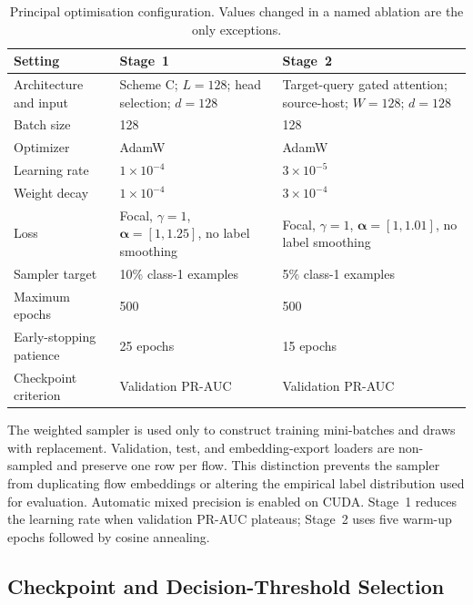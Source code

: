 \documentclass[11pt,fleqn]{report}
\begin{document}
\begin{table}[H]
    \centering
    \caption{Principal optimisation configuration. Values changed in a named ablation are the only exceptions.}
    \label{tab:experimental_training_config}
    \begin{tabular}{@{}p{3.0cm}p{4.6cm}p{5.7cm}@{}}
        \toprule
        Setting & Stage~1 & Stage~2 \\
        \midrule
        Architecture and input & Scheme C; $L=128$; head selection; $d=128$ & Target-query gated attention; source-host; $W=128$; $d=128$ \\
        Batch size & 128 & 128 \\
        Optimizer & AdamW & AdamW \\
        Learning rate & $1\times10^{-4}$ & $3\times10^{-5}$ \\
        Weight decay & $1\times10^{-4}$ & $3\times10^{-4}$ \\
        Loss & Focal, $\gamma=1$, $\boldsymbol{\alpha}=[1,1.25]$, no label smoothing & Focal, $\gamma=1$, $\boldsymbol{\alpha}=[1,1.01]$, no label smoothing \\
        Sampler target & 10\% class-1 examples & 5\% class-1 examples \\
        Maximum epochs & 500 & 500 \\
        Early-stopping patience & 25 epochs & 15 epochs \\
        Checkpoint criterion & Validation PR-AUC & Validation PR-AUC \\
        \bottomrule
    \end{tabular}
\end{table}

The weighted sampler is used only to construct training mini-batches and draws with replacement. Validation, test, and embedding-export loaders are non-sampled and preserve one row per flow. This distinction prevents the sampler from duplicating flow embeddings or altering the empirical label distribution used for evaluation. Automatic mixed precision is enabled on CUDA. Stage~1 reduces the learning rate when validation PR-AUC plateaus; Stage~2 uses five warm-up epochs followed by cosine annealing.

\subsection{Checkpoint and Decision-Threshold Selection}
\label{subsubsec:experimental_thresholding}
\end{document}
